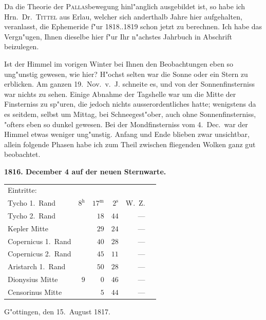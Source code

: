 \documentclass[12pt,a4paper]{article}
\begin{document}
Da die Theorie der \textsc{Pallas}bewegung hinl"anglich ausgebildet ist, so habe ich Hrn.~Dr.~\textsc{Tittel} aus
Erlau, welcher sich anderthalb Jahre hier aufgehalten, veranlasst, die Ephemeride f"ur 1818..1819 schon
jetzt zu berechnen. Ich habe das Vergn"ugen, Ihnen dieselbe hier f"ur Ihr n"achstes Jahrbuch in Abschrift
beizulegen.

Ist der Himmel im vorigen Winter bei Ihnen den Beobachtungen eben so ung"unstig gewesen,
wie hier? H"ochst selten war die Sonne oder ein Stern zu erblicken. Am ganzen 19.~Nov.~v.~J. schneite
es, und von der Sonnenfinsterniss war nichts zu sehen. Einige Abnahme der Tagshelle war um die
Mitte der Finsterniss zu sp"uren, die jedoch nichts ausserordentliches hatte; wenigstens da es seitdem,
selbst um Mittag, bei Schneegest"ober, auch ohne Sonnenfinsterniss, "ofters eben so dunkel gewesen.
Bei der Mondfinsterniss vom 4.~Dec.~war der Himmel etwas weniger ung"unstig. Anfang und Ende blieben
zwar unsichtbar, allein folgende Phasen habe ich zum Theil zwischen fliegenden Wolken ganz gut beobachtet.

\begin{center}
\textbf{1816. December 4 auf der neuen Sternwarte.}
\end{center}

\begin{center}
\begin{tabular}{l@{\quad\dotfill\quad}r@{\ }r@{\ }r@{\ }r@{\ }r}
\multicolumn{6}{l}{Eintritte:} \\
Tycho 1.~Rand & $8^{\mathrm{h}}$ & $17^{\mathrm{m}}$ & $2^{\mathrm{s}}$ & W.~Z. \\
Tycho 2.~Rand & & $18$ & $44$ & --- \\
Kepler Mitte & & $29$ & $24$ & --- \\
Copernicus 1.~Rand & & $40$ & $28$ & --- \\
Copernicus 2.~Rand & & $45$ & $11$ & --- \\
Aristarch 1.~Rand & & $50$ & $28$ & --- \\
Dionysius Mitte & $9$ & $\phantom{0}0$ & $46$ & --- \\
Censorinus Mitte & & $\phantom{0}5$ & $44$ & --- \\
\end{tabular}
\end{center}

\vspace{1em}

\begin{flushright}
G"ottingen, den 15.~August 1817.
\end{flushright}
\end{document}
